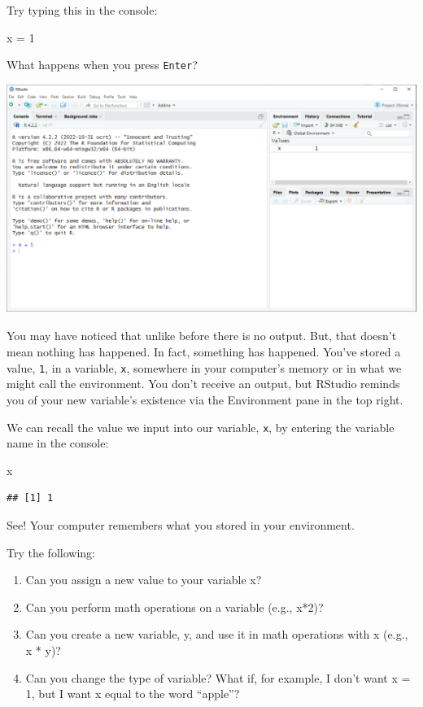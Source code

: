 \documentclass[
]{book}
\newenvironment{Shaded}{\begin{snugshade}}{\end{snugshade}}
\newcommand{\DecValTok}[1]{\textcolor[rgb]{0.00,0.00,0.81}{#1}}
\newcommand{\NormalTok}[1]{#1}
\newcommand{\OtherTok}[1]{\textcolor[rgb]{0.56,0.35,0.01}{#1}}
\begin{document}
Try typing this in the console:

\begin{Shaded}
\begin{Highlighting}[]
\NormalTok{x }\OtherTok{=} \DecValTok{1}
\end{Highlighting}
\end{Shaded}

What happens when you press \texttt{Enter}?

\includegraphics{docs/_main_files/figure-html/RStudio console_x1.png}

You may have noticed that unlike before there is no output. But, that doesn't mean nothing has happened. In fact, something has happened. You've stored a value, \texttt{1}, in a variable, \texttt{x}, somewhere in your computer's memory or in what we might call the environment. You don't receive an output, but RStudio reminds you of your new variable's existence via the Environment pane in the top right.

We can recall the value we input into our variable, \texttt{x}, by entering the variable name in the console:

\begin{Shaded}
\begin{Highlighting}[]
\NormalTok{x}
\end{Highlighting}
\end{Shaded}

\begin{verbatim}
## [1] 1
\end{verbatim}

See! Your computer remembers what you stored in your environment.

Try the following:

\begin{enumerate}
\def\labelenumi{\arabic{enumi}.}
\item
  Can you assign a new value to your variable x?
\item
  Can you perform math operations on a variable (e.g., x*2)?
\item
  Can you create a new variable, y, and use it in math operations with x (e.g., x * y)?
\item
  Can you change the type of variable? What if, for example, I don't want x = 1, but I want x equal to the word ``apple''?
\end{enumerate}
\end{document}

